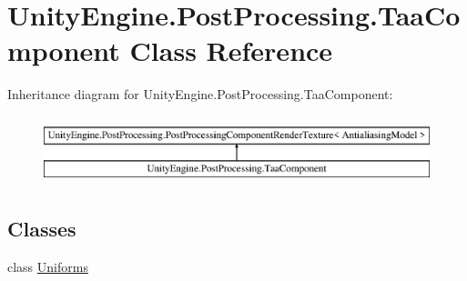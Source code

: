 \hypertarget{class_unity_engine_1_1_post_processing_1_1_taa_component}{}\section{Unity\+Engine.\+Post\+Processing.\+Taa\+Component Class Reference}
\label{class_unity_engine_1_1_post_processing_1_1_taa_component}
Inheritance diagram for Unity\+Engine.\+Post\+Processing.\+Taa\+Component\+:\begin{figure}[H]
\begin{center}
\leavevmode
\includegraphics[height=2.000000cm]{class_unity_engine_1_1_post_processing_1_1_taa_component}
\end{center}
\end{figure}
\subsection*{Classes}
\begin{DoxyCompactItemize}
\item 
class \hyperlink{class_unity_engine_1_1_post_processing_1_1_taa_component_1_1_uniforms}{Uniforms}
\end{DoxyCompactItemize}
